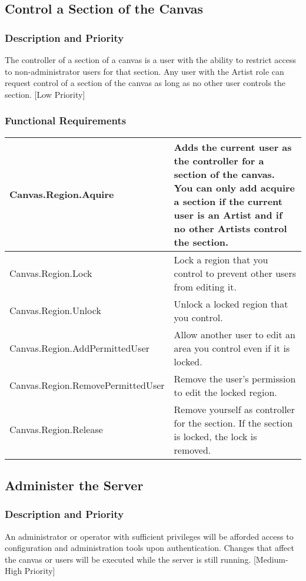 \documentclass[11pt,oneside,a4paper]{article}
\begin{document}
\subsection{Control a Section of the Canvas}
\subsubsection{Description and Priority}
The controller of a section of a canvas is a user with the ability to restrict access to non-administrator users for that section. Any user with the Artist role can request control of a section of the canvas as long as no other user controls the section.
[Low Priority]
\subsubsection{Functional Requirements}

\begin{center}
\begin{tabular}{ | p{6cm} | p{6cm} | }
\hline
\tiny{Canvas.Region.Aquire}			& \tiny{Adds the current user as the controller for a section of the canvas. You can only add acquire a section if the current user is an Artist and if no other Artists control the section.} \\
\hline
\tiny{Canvas.Region.Lock}			& \tiny{Lock a region that you control to prevent other users from editing it.} \\
\hline
\tiny{Canvas.Region.Unlock}			& \tiny{Unlock a locked region that you control.} \\
\hline
\tiny{Canvas.Region.AddPermittedUser}		& \tiny{Allow another user to edit an area you control even if it is locked.} \\
\hline
\tiny{Canvas.Region.RemovePermittedUser}	& \tiny{Remove the user's permission to edit the locked region.} \\
\hline
\tiny{Canvas.Region.Release}			& \tiny{Remove yourself as controller for the section. If the section is locked, the lock is removed.} \\
\hline
\end{tabular}
\end{center}

\subsection{Administer the Server}
\subsubsection{Description and Priority}
An administrator or operator with sufficient privileges will be afforded access to configuration and administration tools upon authentication. Changes that affect the canvas or users will be executed while the server is still running.
[Medium-High Priority]
\end{document}
